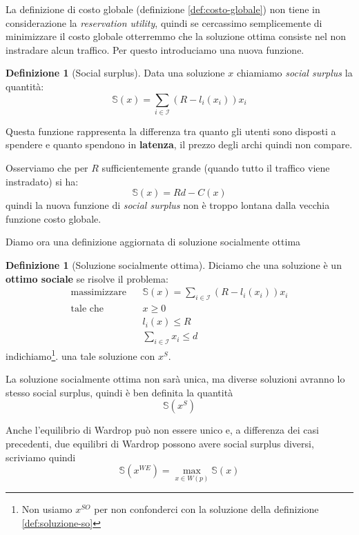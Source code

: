 \documentclass[a4paper]{article}
\newcounter{counter1}
\theoremstyle{plain}
\theoremstyle{definition}
\newtheorem{mydef}[counter1]{Definizione}
\theoremstyle{remark}
\newcommand{\pa}[1]{\left(#1\right)}
\begin{document}
La definizione di costo globale (definizione \ref{def:costo-globale})
non tiene in considerazione la \textit{reservation utility}, quindi se
cercassimo semplicemente di minimizzare il costo globale otterremmo
che la soluzione ottima consiste nel non instradare alcun
traffico. Per questo introduciamo una nuova funzione.

\begin{mydef}[Social surplus]
  Data una soluzione $x$ chiamiamo \textit{social surplus} la
  quantità:
  \[ \mathbb{S}(x) = \sum _{i\in\mathcal{I}}\pa{ R -
      l_i\pa{x_i}}x_i \]
\end{mydef}

Questa funzione rappresenta la differenza tra quanto gli utenti sono
disposti a spendere e quanto spendono in \textbf{latenza}, il prezzo
degli archi quindi non compare.

Osserviamo che per $R$ sufficientemente grande (quando tutto il
traffico viene instradato) si ha:
\[ \mathbb{S}(x) = Rd - C(x) \]
quindi la nuova funzione di \textit{social surplus} non è troppo
lontana dalla vecchia funzione costo globale.

Diamo ora una definizione aggiornata di soluzione socialmente ottima
\begin{mydef}[Soluzione socialmente ottima]
  Diciamo che una soluzione è un \textbf{ottimo sociale} se risolve il
  problema:
  \begin{align*}
    \text{massimizzare }\;\; & \mathbb{S}(x) = \sum
                               _{i\in\mathcal{I}}\pa{ R - l_i\pa{x_i}}x_i
    \\
    \text{tale che }\;\; & x\ge 0\\
                             & l_i(x) \le R \\
                             & \sum _{i\in \mathcal{I}} x_i \le d
  \end{align*}
  indichiamo\footnote{Non usiamo $x^{SO}$ per non confonderci con la
    soluzione della definizione \ref{def:soluzione-so}}. una tale
  soluzione con $x^S$.
\end{mydef}

La soluzione socialmente ottima non sarà unica, ma diverse soluzioni
avranno lo stesso social surplus, quindi è ben definita la quantità
\[ \mathbb{S}\pa{x^{S}} \]

Anche l'equilibrio di Wardrop può non essere unico e, a differenza dei
casi precedenti, due equilibri di Wardrop possono avere social surplus
diversi, scriviamo quindi
\[ \mathbb{S}\pa{x^{WE}} = \max _{x\in W(p)} \mathbb{S}\pa{x} \]
\end{document}

